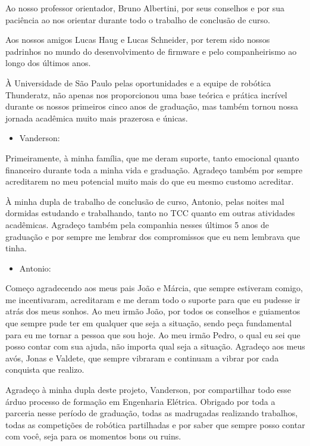 \documentclass[../../monografia.tex]{subfiles}
\begin{document}
    
    {\centering    
    }

Ao nosso professor orientador, Bruno Albertini, por seus conselhos e por sua paciência ao nos orientar durante todo o trabalho de conclusão de curso.

Aos nossos amigos Lucas Haug e Lucas Schneider, por terem sido nossos padrinhos no mundo do desenvolvimento de firmware e pelo companheirismo ao longo dos últimos anos.

À Universidade de São Paulo pelas oportunidades e a equipe de robótica Thunderatz, não apenas nos proporcionou uma base teórica e prática incrível durante os nossos primeiros cinco anos de graduação, mas também tornou nossa jornada acadêmica muito mais prazerosa e únicas.

\vspace{6mm}

\begin{itemize}
    \item Vanderson:
\end{itemize}

Primeiramente, à minha família, que me deram suporte, tanto emocional quanto financeiro durante toda a minha vida e graduação. Agradeço também por sempre acreditarem no meu potencial muito mais do que eu mesmo customo acreditar. 

À minha dupla de trabalho de conclusão de curso, Antonio, pelas noites mal dormidas estudando e trabalhando, tanto no TCC quanto em outras atividades acadêmicas. Agradeço também pela companhia nesses últimos 5 anos de graduação e por sempre me lembrar dos compromissos que eu nem lembrava que tinha.

\vspace{6mm}

\begin{itemize}
    \item Antonio:
\end{itemize}

Começo agradecendo aos meus pais João e Márcia, que sempre estiveram comigo, me incentivaram, acreditaram e me deram todo o suporte para que eu pudesse ir atrás dos meus sonhos. Ao meu irmão João, por todos os conselhos e guiamentos que sempre pude ter em qualquer que seja a situação, sendo peça fundamental para eu me tornar a pessoa que sou hoje. Ao meu irmão Pedro, o qual eu sei que posso contar com sua ajuda, não importa qual seja a situação. Agradeço aos meus avós, Jonas e Valdete, que sempre vibraram e continuam a vibrar por cada conquista que realizo.

Agradeço à minha dupla deste projeto, Vanderson, por compartilhar todo esse árduo processo de formação em Engenharia Elétrica. Obrigado por toda a parceria nesse período de graduação, todas as madrugadas realizando trabalhos, todas as competições de robótica partilhadas e por saber que sempre posso contar com você, seja para os momentos bons ou ruins.
\end{document}
